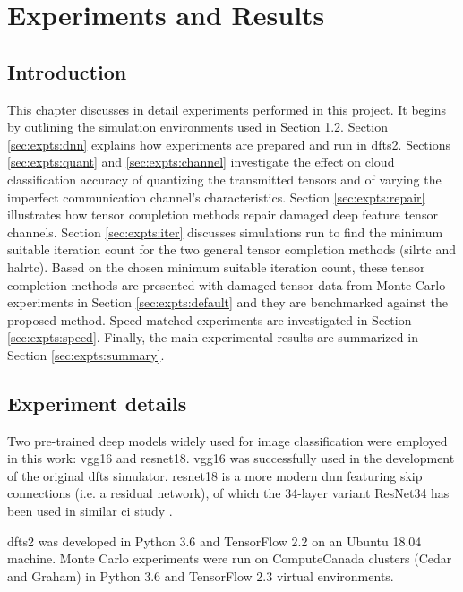 \chapter{Experiments and Results} \label{chapter:expts}

\section{Introduction} \label{sec:expts:intro}
This chapter discusses in detail experiments performed in this project. It begins by outlining the simulation environments used in Section \ref{sec:expts:details}. Section 
\ref{sec:expts:dnn} explains how experiments are prepared and run in \gls{dfts}2. Sections \ref{sec:expts:quant} and \ref{sec:expts:channel} investigate the effect on cloud classification accuracy of quantizing the transmitted tensors and of varying the imperfect communication channel's characteristics. Section \ref{sec:expts:repair} illustrates how tensor completion methods repair damaged deep feature tensor channels. Section \ref{sec:expts:iter} discusses simulations run to find the minimum suitable iteration count for the two general tensor completion methods (\gls{silrtc} and \gls{halrtc}). Based on the chosen minimum suitable iteration count, these tensor completion methods are presented with damaged tensor data from Monte Carlo experiments in Section \ref{sec:expts:default} and they are benchmarked against the proposed method. Speed-matched experiments are investigated in Section \ref{sec:expts:speed}. Finally, the main experimental results are summarized in Section \ref{sec:expts:summary}.

\section{Experiment details} \label{sec:expts:details}
Two pre-trained deep models widely used for image classification were employed in this work: \gls{vgg16} and \gls{resnet18}. \gls{vgg16} was successfully used in the development of the original \gls{dfts} simulator. \gls{resnet18} is a more modern \gls{dnn} featuring skip connections (i.e. a residual network), of which the 34-layer variant ResNet34 has been used in similar \gls{ci} study \cite{9017944}.

\gls{dfts}2 was developed in Python 3.6 and TensorFlow 2.2 on an Ubuntu 18.04 machine. Monte Carlo experiments were run on ComputeCanada clusters (Cedar and Graham) in Python 3.6 and TensorFlow 2.3 virtual environments.

